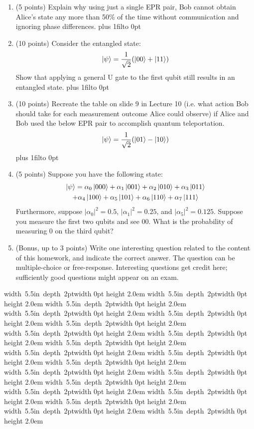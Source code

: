 \documentclass[12pt]{article}
\newcommand{\BlankLine}{\mbox{\hskip 4pt\vrule width 5.5in depth 2pt}\vrule width 0pt height 2.0em}
\def\DefaultSpace{1in}
\newcommand{\LeaveSpace}[1][\DefaultSpace]{%
\vskip #1 plus 1fil\relax\hbox to 0pt{\hss} %
}
\begin{document}
\begin{enumerate}[font=\bfseries]
    \item (5 points) Explain why using just a single EPR pair, Bob cannot obtain Alice's state any more than 50\% of the time without communication and ignoring phase differences. \LeaveSpace{}
    \item (10 points) Consider the entangled state: 
    \[\ket{\psi} = \frac{1}{\sqrt{2}}(\ket{00}+\ket{11})\]
    Show that applying a general U gate to the first qubit still results in an entangled state. \LeaveSpace[2.5in]
    \item (10 points) Recreate the table on slide 9 in Lecture 10 (i.e. what action Bob should take for each measurement outcome Alice could observe) if Alice and Bob used the below EPR pair to accomplish quantum teleportation.
    \[\ket{\psi} = \frac{1}{\sqrt{2}}(\ket{01}-\ket{10})\]
    \LeaveSpace[2.25in]
    \item (5 points) Suppose you have the following state:
    \begin{multline} \ket{\psi} = 
        \alpha_0\ket{000} + \alpha_1\ket{001} +
                    \alpha_2\ket{010} + \alpha_3\ket{011}  \\
                    + \alpha_4\ket{100} + \alpha_5\ket{101} +
                    \alpha_6\ket{110} + \alpha_7\ket{111}
    \end{multline}
    Furthermore, suppose $|\alpha_0|^2 = 0.5$, $|\alpha_1|^2 = 0.25$, and $|\alpha_5|^2 = 0.125$. Suppose you measure the first two qubits and see $00$. What is the probability of measuring 0 on the third qubit? \newpage
    \item (Bonus, up to 3 points) Write one interesting question related to the content of this homework, and indicate the correct answer. The question can be multiple-choice or free-response.  Interesting questions get credit here;  sufficiently good questions might appear on an exam.
\end{enumerate}
\newpage
\noindent \BlankLine{}
\BlankLine{}
\BlankLine{}
\BlankLine{}
\BlankLine{}
\BlankLine{}
\BlankLine{}
\BlankLine{}
\BlankLine{}
\BlankLine{}
\BlankLine{}
\BlankLine{}
\BlankLine{}
\BlankLine{}
\BlankLine{}
\BlankLine{}
\BlankLine{}
\BlankLine{}
\BlankLine{}
\BlankLine{}
\end{document}
